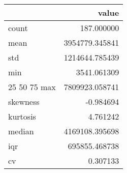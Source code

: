 \begin{tabular}{lr}
\toprule
 & value \\
\midrule
count & 187.000000 \\
mean & 3954779.345841 \\
std & 1214644.785439 \\
min & 3541.061309 \\
25%
50%
75%
max & 7809923.058741 \\
skewness & -0.984694 \\
kurtosis & 4.761242 \\
median & 4169108.395698 \\
iqr & 695855.468738 \\
cv & 0.307133 \\
\bottomrule
\end{tabular}
